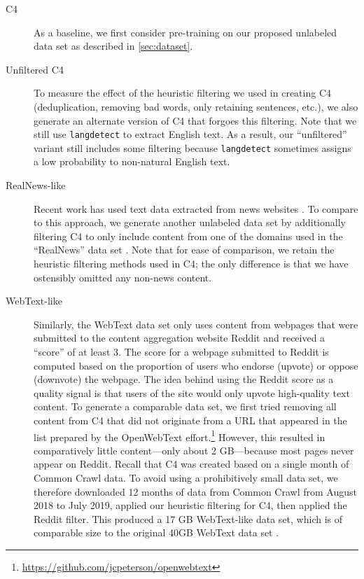 \documentclass[twoside,11pt]{article}
\begin{document}
\begin{description}
\item[C4] As a baseline, we first consider pre-training on our proposed unlabeled data set as described in \cref{sec:dataset}.

\item[Unfiltered C4] To measure the effect of the heuristic filtering we used in creating C4 (deduplication, removing bad words, only retaining sentences, etc.), we also generate an alternate version of C4 that forgoes this filtering.
Note that we still use \texttt{langdetect} to extract English text.
As a result, our ``unfiltered'' variant still includes some filtering because \texttt{langdetect} sometimes assigns a low probability to non-natural English text.

\item[RealNews-like] Recent work has used text data extracted from news websites \citep{zellers2019defending,baevski2019cloze}.
To compare to this approach, we generate another unlabeled data set by additionally filtering C4 to only include content from one of the domains used in the ``RealNews'' data set \citep{zellers2019defending}.
Note that for ease of comparison, we retain the heuristic filtering methods used in C4; the only difference is that we have ostensibly omitted any non-news content.

\item[WebText-like] Similarly, the WebText data set \citep{radford2019language} only uses content from webpages that were submitted to the content aggregation website Reddit and received a ``score'' of at least 3.
The score for a webpage submitted to Reddit is computed based on the proportion of users who endorse (upvote) or oppose (downvote) the webpage.
The idea behind using the Reddit score as a quality signal is that users of the site would only upvote high-quality text content.
To generate a comparable data set, we first tried removing all content from C4 that did not originate from a URL that appeared in the list prepared by the OpenWebText effort.\footnote{\url{https://github.com/jcpeterson/openwebtext}}
However, this resulted in comparatively little content---only about 2 GB---because most pages never appear on Reddit.
Recall that C4 was created based on a single month of Common Crawl data.
To avoid using a prohibitively small data set, we therefore downloaded 12 months of data from Common Crawl from August 2018 to July 2019, applied our heuristic filtering for C4, then applied the Reddit filter.
This produced a 17 GB WebText-like data set, which is of comparable size to the original 40GB WebText data set \citep{radford2019language}.


\end{description}
\end{document}
